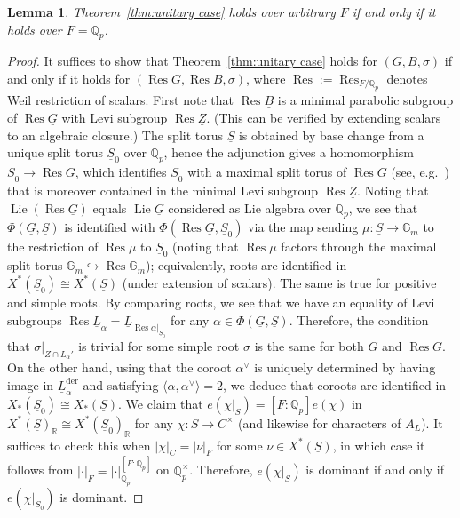 \documentclass[a4paper]{amsart}
\numberwithin{equation}{section}
\newtheorem{lem}[thm]{Lemma}
\theoremstyle{remark}
\theoremstyle{definition}
\DeclareMathOperator{\Lie}{Lie}
\DeclareMathOperator{\Res}{Res}
\newcommand{\Q}{\mathbb{Q}}
\newcommand{\R}{\mathbb{R}}
\newcommand{\alggrp}[1]{\underline{#1}}
\newcommand{\der}{\mathrm{der}}
\newcommand{\ang}[1]{\langle #1\rangle}
\newcommand{\into}{\hookrightarrow}
\begin{document}
\begin{lem}
  Theorem~\ref{thm:unitary case} holds over arbitrary $F$ if and only if it holds over $F = \Q_p$.
\end{lem}

\begin{proof}
  It suffices to show that Theorem~\ref{thm:unitary case} holds for $(G, B, \sigma)$ if and only if it holds for $(\Res G, \Res B, \sigma)$,
  where $\Res := \Res_{F/\Q_p}$ denotes Weil restriction of scalars.
  First note that $\Res \alggrp B$ is a minimal parabolic subgroup of $\Res \alggrp G$ with Levi subgroup $\Res \alggrp Z$.
  (This can be verified by extending scalars to an algebraic closure.)
  The split torus $\alggrp S$ is obtained by base change from a unique split torus $\alggrp S_0$ over $\Q_p$, hence the adjunction gives a homomorphism $\alggrp S_0 \to \Res \alggrp G$,
  which identifies $\alggrp S_0$ with a maximal split torus of $\Res \alggrp G$ (see, e.g.\ \cite[\S4.2]{MR4120166}) that is moreover contained in the minimal Levi subgroup $\Res \alggrp Z$.
  Noting that $\Lie(\Res \alggrp G)$ equals $\Lie \alggrp G$ considered as Lie algebra over $\Q_p$, we see that $\Phi(\alggrp G,\alggrp S)$ is identified with $\Phi(\Res \alggrp G, \alggrp{S}_{0})$   via the map sending $\mu : \alggrp S \to \mathbb G_m$ to the restriction of $\Res \mu$ to $\alggrp S_0$ 
  (noting that $\Res \mu$ factors through the maximal split torus $\mathbb G_m \into \Res \mathbb G_m$);
  equivalently, roots are identified in $X^*(\alggrp S_0) \cong X^*(\alggrp S)$ (under extension of scalars).
  The same is true for positive and simple roots.
  By comparing roots, we see that we have an equality of Levi subgroups $\Res \alggrp L_\alpha = \alggrp L_{\Res\alpha|_{\alggrp S_0}}$ for any $\alpha \in \Phi(\alggrp G, \alggrp S)$.
  Therefore, the condition that $\sigma|_{Z\cap L_\alpha'}$ is trivial for some simple root $\sigma$ is the same for both $G$ and $\Res G$.
  On the other hand, using that the coroot $\alpha^\vee$ is uniquely determined by having image in $\alggrp L_\alpha^\der$ and satisfying $\ang{\alpha,\alpha^\vee} = 2$,
  we deduce that coroots are identified in $X_*(\alggrp S_0) \cong X_*(\alggrp S)$.
  We claim that $e(\chi|_S) = [F:\Q_p]e(\chi)$ in $X^*(\alggrp S)_\R \cong X^*(\alggrp S_0)_\R$ for any $\chi : S \to C^\times$ (and likewise for characters of $A_L$).
  It suffices to check this when $\lvert\chi\rvert_C = \lvert\nu\rvert_F$ for some $\nu \in X^*(\alggrp S)$, in which case it follows from $\lvert\cdot\rvert_F = \lvert\cdot\rvert_{\Q_p}^{[F:\Q_p]}$ on $\Q_p^\times$.
  Therefore, $e(\chi|_S)$ is dominant if and only if $e(\chi|_{S_0})$ is dominant.
\end{proof}
\end{document}
